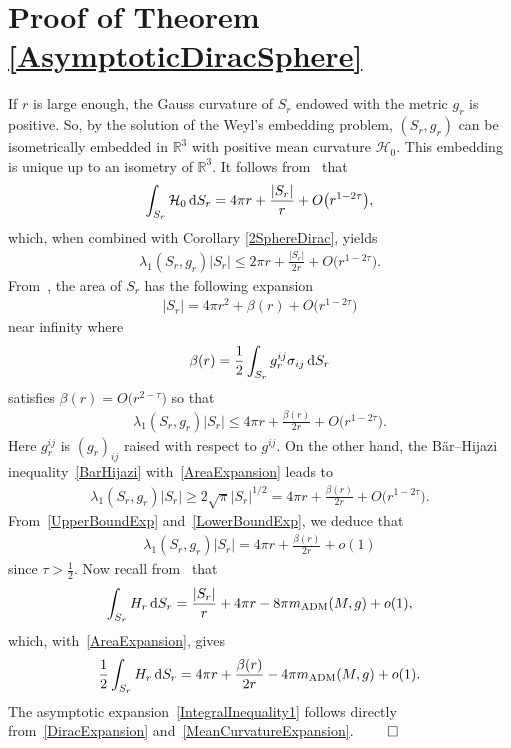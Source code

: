 \documentclass[pdftex]{sigma}
\numberwithin{equation}{section}
\begin{document}
\section{Proof of Theorem \ref{AsymptoticDiracSphere}}\label{LargeSphereLimit}

If $r$ is large enough, the Gauss curvature of $S_r$ endowed with the metric $g_r$ is positive. So, by the solution of the Weyl's embedding problem, $(S_r,g_r)$ can be isometrically embedded in $\mathbb{R}^3$ with positive mean curvature $\mathcal{H}_0$. This embedding is unique up to an isometry of $\mathbb{R}^3$. It follows from~\cite[Lemma~2.4]{FanShiTam} that
\begin{gather*}%
\int_{S_r}\mathcal{H}_0\,{\rm d}S_r=4\pi r+\frac{|S_r|}{r}+O\big(r^{1-2\tau}\big),
\end{gather*}
which, when combined with Corollary \ref{2SphereDirac}, yields
\begin{gather*}
\lambda_1(S_r,g_r)|S_r|\leq 2\pi r+\frac{|S_r|}{2r}+O\big(r^{1-2\tau}\big).
\end{gather*}
From~\cite[Lemma 2.1]{FanShiTam}, the area of $S_r$ has the following expansion
\begin{gather}\label{AreaExpansion}
|S_r|=4\pi r^2+\beta(r)+O\big(r^{1-2\tau}\big)
\end{gather}
near infinity where
\begin{gather*}
\beta(r)=\frac{1}{2}\int_{S_r}g_r^{ij}\sigma_{ij}\,{\rm d}S_r
\end{gather*}
satisfies $\beta(r)=O\big(r^{2-\tau}\big)$ so that
\begin{gather}\label{UpperBoundExp}
\lambda_1(S_r,g_r)|S_r|\leq 4\pi r+\frac{\beta(r)}{2r}+O\big(r^{1-2\tau}\big).
\end{gather}
Here $g_r^{ij}$ is $(g_r)_{ij}$ raised with respect to $g^{ij}$. On the other hand, the B\"ar--Hijazi inequality~\eqref{BarHijazi} with~\eqref{AreaExpansion} leads to
\begin{gather}\label{LowerBoundExp}
\lambda_1(S_r,g_r)|S_r|\geq 2\sqrt{\pi}|S_r|^{1/2}=4\pi r+\frac{\beta(r)}{2r}+O\big(r^{1-2\tau}\big).
\end{gather}
From~\eqref{UpperBoundExp} and~\eqref{LowerBoundExp}, we deduce that
\begin{gather}\label{DiracExpansion}
\lambda_1(S_r,g_r)|S_r|=4\pi r+\frac{\beta(r)}{2r}+o(1)
\end{gather}
since $\tau>\frac{1}{2}$. Now recall from~\cite[Lemma 2.2]{FanShiTam} that
\begin{gather*}
\int_{S_r}H_r\,{\rm d}S_r=\frac{|S_r|}{r}+4\pi r-8\pi m_{\rm ADM}(M,g)+o(1),
\end{gather*}
which, with~\eqref{AreaExpansion}, gives
\begin{gather}\label{MeanCurvatureExpansion}
\frac{1}{2}\int_{S_r}H_r\,{\rm d}S_r= 4\pi r+\frac{\beta(r)}{2r}-4\pi m_{\rm ADM}(M,g)+o(1).
\end{gather}
The asymptotic expansion~\eqref{IntegralInequality1} follows directly from~\eqref{DiracExpansion} and~\eqref{MeanCurvatureExpansion}.
\hfill$\qed$
\end{document}

